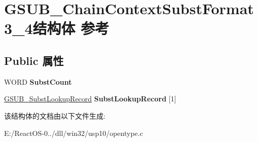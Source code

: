 \hypertarget{struct_g_s_u_b___chain_context_subst_format3__4}{}\section{G\+S\+U\+B\+\_\+\+Chain\+Context\+Subst\+Format3\+\_\+4结构体 参考}
\label{struct_g_s_u_b___chain_context_subst_format3__4}
\subsection*{Public 属性}
\begin{DoxyCompactItemize}
\item 
\mbox{\label{struct_g_s_u_b___chain_context_subst_format3__4_a7a0806cae3e5899d58c6a18492ea1e67}} 
W\+O\+RD {\bfseries Subst\+Count}
\item 
\mbox{\label{struct_g_s_u_b___chain_context_subst_format3__4_a8276ee170a84c68849f44613ffbcdaf8}} 
\hyperlink{struct_g_s_u_b___subst_lookup_record}{G\+S\+U\+B\+\_\+\+Subst\+Lookup\+Record} {\bfseries Subst\+Lookup\+Record} \mbox{[}1\mbox{]}
\end{DoxyCompactItemize}


该结构体的文档由以下文件生成\+:\begin{DoxyCompactItemize}
\item 
E\+:/\+React\+O\+S-\/0../dll/win32/usp10/opentype.\+c\end{DoxyCompactItemize}
